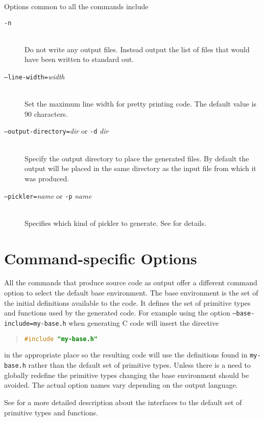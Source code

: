 Options common to all the commands include
\begin{description}
  \item[\normalfont\texttt{-n}] \mbox{}\\
      Do not write any output files.
      Instead output the list of files that would have been written to standard out.
  \item[\normalfont\texttt{--line-width=}\textit{width}] \mbox{}\\
    Set the maximum line width for pretty printing code.
    The default value is 90 characters.
  \item[\normalfont\texttt{--output-directory=}\textit{dir} or \texttt{-d} \textit{dir}] \mbox{}\\
    Specify the output directory to place the generated files.
    By default the output will be placed in the same directory as the
    input file from which it was produced.
  \item[\normalfont\texttt{--pickler=}\textit{name} or \texttt{-p} \textit{name}] \mbox{}\\
    Specifies which kind of pickler to generate.
    See  for details.
\end{description}%

\section*{Command-specific Options}

All the commands that produce source code as output offer a different
command option to select the default base environment.
The base environment is the set of the initial definitions available to the code.
It defines the set of primitive types and functions used by the generated code.
For example using the option \texttt{--base-include=my-base.h}
when generating C code will insert the directive
\begin{quote}\begin{lstlisting}[language=c]
#include "my-base.h"
\end{lstlisting}\end{quote}%
in the appropriate place so the resulting code will use the definitions found in
\texttt{my-base.h} rather than the default set of primitive types.
Unless there is a need to globally redefine
the primitive types changing the base environment should be avoided.
The actual option names vary depending on the output language.

See  for a more detailed description about the interfaces
to the default set of primitive types and functions.

